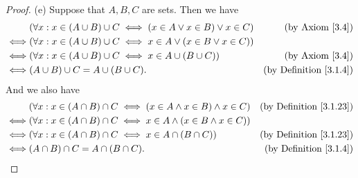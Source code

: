 \begin{proof}{(e)}
    Suppose that \(A, B, C\) are sets.
    Then we have
    \begin{align*}
             & (\forall x : x \in (A \cup B) \cup C \iff (x \in A \lor x \in B) \lor x \in C) & \text{(by Axiom \ref{3.4})}        \\
        \iff & (\forall x : x \in (A \cup B) \cup C \iff x \in A \lor (x \in B \lor x \in C))                                      \\
        \iff & (\forall x : x \in (A \cup B) \cup C \iff x \in A \cup (B \cup C))             & \text{(by Axiom \ref{3.4})}        \\
        \iff & (A \cup B) \cup C = A \cup (B \cup C).                                         & \text{(by Definition \ref{3.1.4})}
    \end{align*}
    And we also have
    \begin{align*}
             & (\forall x : x \in (A \cap B) \cap C \iff (x \in A \land x \in B) \land x \in C) & \text{(by Definition \ref{3.1.23})} \\
        \iff & (\forall x : x \in (A \cap B) \cap C \iff x \in A \land (x \in B \land x \in C))                                       \\
        \iff & (\forall x : x \in (A \cap B) \cap C \iff x \in A \cap (B \cap C))               & \text{(by Definition \ref{3.1.23})} \\
        \iff & (A \cap B) \cap C = A \cap (B \cap C).                                           & \text{(by Definition \ref{3.1.4})}
    \end{align*}
\end{proof}

